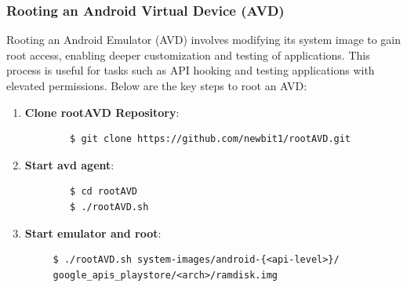 \documentclass[a4paper,12pt]{article}
\begin{document}
\subsubsection{Rooting an Android Virtual Device (AVD)}
Rooting an Android Emulator (AVD) involves modifying its system image to gain root access, enabling deeper customization and testing of applications. This process is useful for tasks such as API hooking and testing applications with elevated permissions. Below are the key steps to root an AVD:

\begin{enumerate}
    \item \textbf{Clone rootAVD Repository}:
    \begin{verbatim}
        $ git clone https://github.com/newbit1/rootAVD.git
    \end{verbatim}

    \item \textbf{Start avd agent}:
    \begin{verbatim}
        $ cd rootAVD
        $ ./rootAVD.sh
    \end{verbatim}

    \item \textbf{Start emulator and root}:
    \begin{verbatim}
     $ ./rootAVD.sh system-images/android-{<api-level>}/
     google_apis_playstore/<arch>/ramdisk.img
    \end{verbatim}

\end{enumerate}
\end{document}
